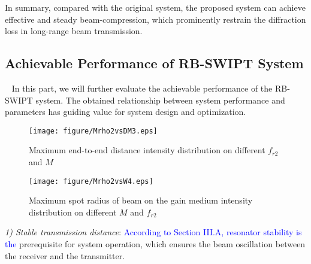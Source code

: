 \documentclass{IEEEtran}
\begin{document}
In summary, compared with the original system, the proposed system can achieve effective and steady beam-compression, which prominently restrain the diffraction loss in long-range beam transmission. %
\subsection{Achievable Performance of RB-SWIPT System}\
In this part,  we will further evaluate the achievable performance of the RB-SWIPT system. The obtained relationship between system performance and parameters has guiding value for system design and optimization.
\begin{figure}[t]
	\centering
	\texttt{[image: figure/Mrho2vsDM3.eps]}
	\caption{Maximum end-to-end distance intensity distribution on different $f_{r2}$ and $M$}
	\label{Tt}
\end{figure}

\begin{figure}[t]
	\centering
	\texttt{[image: figure/Mrho2vsW4.eps]}
	\caption{Maximum spot radius of beam on the gain medium intensity distribution on different $M$ and $f_{r2}$}
	\label{Mod}
\end{figure} 
\emph{1) Stable transmission distance}:
\textcolor{blue}{According to Section III.A, resonator stability is the} prerequisite for system operation, which ensures the beam oscillation between the receiver and the transmitter. 
\end{document}
